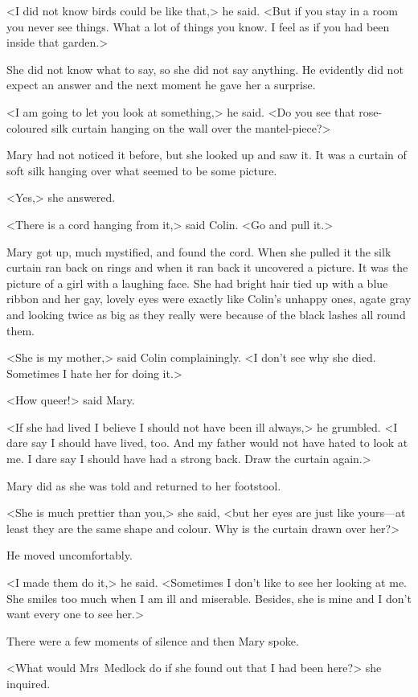 <I did not know birds could be like that,> he said. <But if you stay in a room you never see things. What a lot of things you know. I feel as if you had been inside that garden.>

She did not know what to say, so she did not say anything. He evidently did not expect an answer and the next moment he gave her a surprise.

<I am going to let you look at something,> he said. <Do you see that rose-coloured silk curtain hanging on the wall over the mantel-piece?>

Mary had not noticed it before, but she looked up and saw it. It was a curtain of soft silk hanging over what seemed to be some picture.

<Yes,> she answered.

<There is a cord hanging from it,> said Colin. <Go and pull it.>

Mary got up, much mystified, and found the cord. When she pulled it the silk curtain ran back on rings and when it ran back it uncovered a picture. It was the picture of a girl with a laughing face. She had bright hair tied up with a blue ribbon and her gay, lovely eyes were exactly like Colin's unhappy ones, agate gray and looking twice as big as they really were because of the black lashes all round them.

<She is my mother,> said Colin complainingly. <I don't see why she died. Sometimes I hate her for doing it.>

<How queer!> said Mary.

<If she had lived I believe I should not have been ill always,> he grumbled. <I dare say I should have lived, too. And my father would not have hated to look at me. I dare say I should have had a strong back. Draw the curtain again.>

Mary did as she was told and returned to her footstool.

<She is much prettier than you,> she said, <but her eyes are just like yours—at least they are the same shape and colour. Why is the curtain drawn over her?>

He moved uncomfortably.

<I made them do it,> he said. <Sometimes I don't like to see her looking at me. She smiles too much when I am ill and miserable. Besides, she is mine and I don't want every one to see her.>

There were a few moments of silence and then Mary spoke.

<What would Mrs~Medlock do if she found out that I had been here?> she inquired.

